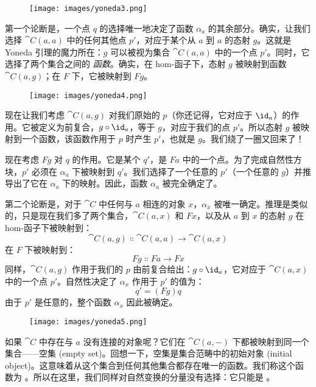 \begin{figure}[H]
  \centering
  \texttt{[image: images/yoneda3.png]}
\end{figure}

\noindent
第一个论断是，一个点 $q$ 的选择唯一地决定了函数 $\alpha_a$ 的其余部分。确实，让我们选择 $\cat{C}(a, a)$ 中的任何其他点 $p'$，对应于某个从 $a$ 到 $a$ 的态射 $g$。这就是 Yoneda 引理的魔力所在：$g$ 可以被视为集合 $\cat{C}(a, a)$ 中的一个点 $p'$。同时，它选择了两个集合之间的 \emph{函数}。确实，在 hom-函子下，态射 $g$ 被映射到函数 $\cat{C}(a, g)$；在 $F$ 下，它被映射到 $F g$。

\begin{figure}[H]
  \centering
  \texttt{[image: images/yoneda4.png]}
\end{figure}

\noindent
现在让我们考虑 $\cat{C}(a, g)$ 对我们原始的 $p$（你还记得，它对应于 $\id_a$）的作用。它被定义为前复合，$g \circ \id_a$，等于 $g$，对应于我们的点 $p'$。所以态射 $g$ 被映射到一个函数，该函数作用于 $p$ 时产生 $p'$，也就是 $g$。我们绕了一圈又回来了！

现在考虑 $F g$ 对 $q$ 的作用。它是某个 $q'$，是 $F a$ 中的一个点。为了完成自然性方块，$p'$ 必须在 $\alpha_a$ 下被映射到 $q'$。我们选择了一个任意的 $p'$（一个任意的 $g$）并推导出了它在 $\alpha_a$ 下的映射。因此，函数 $\alpha_a$ 被完全确定了。

第二个论断是，对于 $\cat{C}$ 中任何与 $a$ 相连的对象 $x$，$\alpha_x$ 被唯一确定。推理是类似的，只是现在我们多了两个集合，$\cat{C}(a, x)$ 和 $F x$，以及从 $a$ 到 $x$ 的态射 $g$ 在 hom-函子下被映射到：
\[\cat{C}(a, g) \Colon \cat{C}(a, a) \to \cat{C}(a, x)\]
在 $F$ 下被映射到：
\[F g \Colon F a \to F x\]
同样，$\cat{C}(a, g)$ 作用于我们的 $p$ 由前复合给出：$g \circ \id_a$，它对应于 $\cat{C}(a, x)$ 中的一个点 $p'$。自然性决定了 $\alpha_x$ 作用于 $p'$ 的值为：
\[q' = (F g) q\]
由于 $p'$ 是任意的，整个函数 $\alpha_x$ 因此被确定。

\begin{figure}[H]
  \centering
  \texttt{[image: images/yoneda5.png]}
\end{figure}

\noindent
如果 $\cat{C}$ 中存在与 $a$ 没有连接的对象呢？它们在 $\cat{C}(a, -)$ 下都被映射到同一个集合——空集 (empty set)。回想一下，空集是集合范畴中的初始对象 (initial object)。这意味着从这个集合到任何其他集合都存在唯一的函数。我们称这个函数为 。所以在这里，我们同样对自然变换的分量没有选择：它只能是 。

